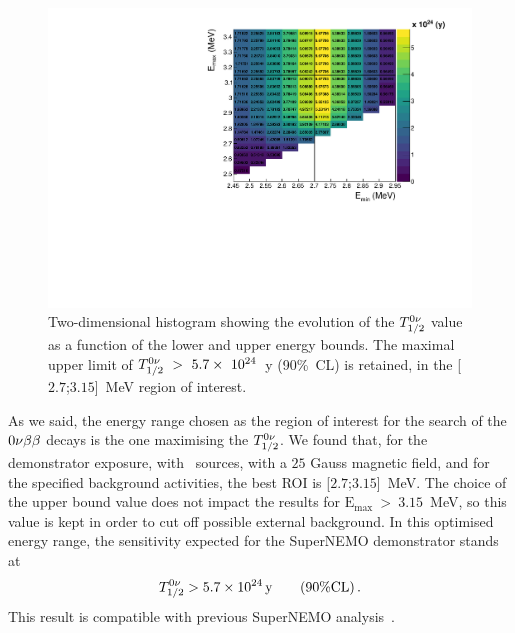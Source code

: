 \begin{figure}[h!]
  \centering
  \includegraphics[width=1.1\textwidth]{Sensitivity/fig_sensitivity/sensitivity_spectrum_with_B_82Se.pdf}
  \caption{Two-dimensional histogram showing the evolution of the $T_{1/2}^{0\nu}$ value as a function of the lower and upper energy bounds.
    The maximal upper limit of $T_{1/2}^{0\nu}~>~5.7\times~10^{24}$~y (90\%~CL) is retained, in the [$2.7$;$3.15$]~MeV region of interest.
    \label{fig:sensitivity_cont}}
\end{figure}
As we said, the energy range chosen as the region of interest for the search of the $0\nu\beta\beta$ decays is the one maximising the $T_{1/2}^{0\nu}$.
We found that, for the demonstrator exposure, with \Se\ sources, with a $25$ Gauss magnetic field, and for the specified background activities, the best ROI is [$2.7$;$3.15$]~MeV.
The choice of the upper bound value does not impact the results for $\text{E}_{\text{max}}~>~3.15$~MeV, so this value is kept in order to cut off possible external background.
In this optimised energy range, the sensitivity expected for the SuperNEMO demonstrator stands at
\begin{equation}
T_{1/2}^{0\nu} > 5.7\times 10^{24}\,\text{y}\qquad (90\% \text{CL})\,.
\end{equation}
This result is compatible with previous SuperNEMO analysis~\cite{CalvezThesis}.


